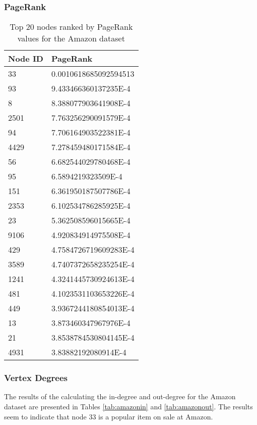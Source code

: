 \subsubsection{PageRank}

\begin{table}[htbp]%
\centering
\begin{tabular}{|l|l|}
\hline
Node ID & PageRank \\
\hline
33 & 0.0010618685092594513 \\
93 & 9.433466360137235E-4 \\
8 & 8.388077903641908E-4 \\
2501 & 7.763256290091579E-4 \\
94 & 7.706164903522381E-4 \\
4429 & 7.278459480171584E-4 \\
56 & 6.682544029780468E-4 \\
95 & 6.5894219323509E-4 \\
151 & 6.361950187507786E-4 \\
2353 & 6.102534786285925E-4 \\
23 & 5.362508596015665E-4 \\
9106 & 4.920834914975508E-4 \\
429 & 4.7584726719609283E-4 \\
3589 & 4.7407372658235254E-4 \\
1241 & 4.3241445730924613E-4 \\
481 & 4.1023531103653226E-4 \\
449 & 3.9367244180854013E-4 \\
13 & 3.873460347967976E-4 \\
21 & 3.8538784530804145E-4 \\
4931 & 3.83882192080914E-4 \\
\hline
\end{tabular}
\caption{Top 20 nodes ranked by PageRank values for the Amazon dataset}
\label{tab:amazonpr}
\end{table}

\subsubsection{Vertex Degrees}
The results of the calculating the in-degree and out-degree for the Amazon dataset are presented in Tables \ref{tab:amazonin} and \ref{tab:amazonout}. The results seem to indicate that node 33 is a popular item on sale at Amazon.

